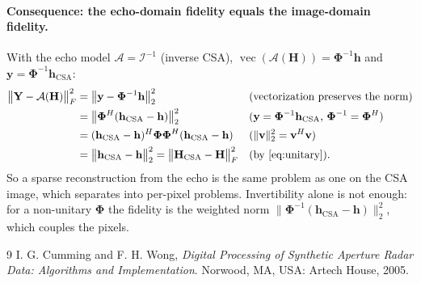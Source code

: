 \documentclass[11pt,a4paper]{article}
\newcommand{\bPhi}{\boldsymbol\Phi}
\newcommand{\y}{\mathbf y}
\newcommand{\h}{\mathbf h}
\DeclareMathOperator{\vect}{vec}
\begin{document}
\paragraph{Consequence: the echo-domain fidelity equals the image-domain fidelity.}
With the echo model $\mathcal A = \mathcal I^{-1}$ (inverse CSA), $\vect(\mathcal A(\mathbf H)) = \bPhi^{-1}\h$ and $\y = \bPhi^{-1}\h_{\mathrm{CSA}}$:
\begin{align}
  \bigl\lVert \mathbf Y - \mathcal A(\mathbf H) \bigr\rVert_F^2
  &= \bigl\lVert \y - \bPhi^{-1}\h \bigr\rVert_2^2
   && \text{(vectorization preserves the norm)} \notag \\
  &= \bigl\lVert \bPhi^{H}(\h_{\mathrm{CSA}} - \h) \bigr\rVert_2^2
   && \text{($\y = \bPhi^{-1}\h_{\mathrm{CSA}}$, $\bPhi^{-1} = \bPhi^H$)} \notag \\
  &= (\h_{\mathrm{CSA}} - \h)^H \bPhi\bPhi^H (\h_{\mathrm{CSA}} - \h)
   && \text{($\lVert\mathbf v\rVert_2^2 = \mathbf v^H\mathbf v$)} \notag \\
  &= \bigl\lVert \h_{\mathrm{CSA}} - \h \bigr\rVert_2^2
   = \bigl\lVert \mathbf H_{\mathrm{CSA}} - \mathbf H \bigr\rVert_F^2
   && \text{(by \eqref{eq:unitary})} .
\end{align}
So a sparse reconstruction from the echo is the same problem as one on the CSA image, which separates into per-pixel problems.
Invertibility alone is not enough: for a non-unitary $\bPhi$ the fidelity is the weighted norm
$\lVert \bPhi^{-1}(\h_{\mathrm{CSA}} - \h) \rVert_2^2$, which couples the pixels.

\begin{thebibliography}{9}
I. G. Cumming and F. H. Wong, \emph{Digital Processing of Synthetic Aperture Radar Data: Algorithms and Implementation}. Norwood, MA, USA: Artech House, 2005.
\end{thebibliography}
\end{document}
